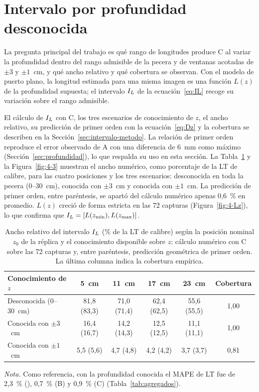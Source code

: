 \section{Intervalo por profundidad desconocida}
\label{sec:intervalo}

La pregunta principal del trabajo es qué rango de longitudes produce C al variar la profundidad dentro del rango admisible de la pecera y de ventanas acotadas de $\pm 3$ y $\pm 1$~cm, y qué ancho relativo y qué cobertura se observan. Con el modelo de puerto plano, la longitud estimada para una misma imagen es una función $L(z)$ de la profundidad supuesta; el intervalo $I_L$ de la ecuación~\eqref{eq:IL} recoge su variación sobre el rango admisible.

El cálculo de $I_L$ con C, los tres escenarios de conocimiento de $z$, el ancho relativo, su predicción de primer orden con la ecuación~\eqref{eq:Dz} y la cobertura se describen en la Sección~\ref{sec:intervalo-metodo}. La relación de primer orden reproduce el error observado de A con una diferencia de 6~mm como máximo (Sección~\ref{sec:profundidad}), lo que respalda su uso en esta sección. La Tabla~\ref{tab:intervalo} y la Figura~\ref{fig:4-3} muestran el ancho numérico, como porcentaje de la LT de calibre, para las cuatro posiciones y los tres escenarios: desconocida en toda la pecera (0--30~cm), conocida con $\pm 3$~cm y conocida con $\pm 1$~cm. La predicción de primer orden, entre paréntesis, se apartó del cálculo numérico apenas 0,6~\% en promedio. $L(z)$ creció de forma estricta en las 72 capturas (Figura~\ref{fig:4-Lz}), lo que confirma que $I_L = [L(z_{\min}), L(z_{\max})]$.

\begin{table}[H]
\centering\footnotesize
\caption{Ancho relativo del intervalo $I_L$ (\% de la LT de calibre) según la posición nominal $z_0$ de la réplica y el conocimiento disponible sobre $z$: cálculo numérico con C sobre las 72 capturas y, entre paréntesis, predicción geométrica de primer orden. La última columna indica la cobertura empírica.}
\label{tab:intervalo}
\begin{tabular}{@{}lccccc@{}}
\toprule
Conocimiento de $z$ & 5~cm & 11~cm & 17~cm & 23~cm & Cobertura \\
\midrule
Desconocida (0--30~cm) & 81,8 (83,3) & 71,0 (71,4) & 62,4 (62,5) & 55,6 (55,5) & 1,00 \\
Conocida con $\pm 3$~cm & 16,4 (16,7) & 14,2 (14,3) & 12,5 (12,5) & 11,1 (11,1) & 1,00 \\
Conocida con $\pm 1$~cm & 5,5 (5,6) & 4,7 (4,8) & 4,2 (4,2) & 3,7 (3,7) & 0,81 \\
\bottomrule
\end{tabular}

\smallskip
\begin{minipage}{0.9\textwidth}\footnotesize
\emph{Nota.} Como referencia, con la profundidad conocida el MAPE de LT fue de 2,3~\% (\Aprime), 0,7~\% (B) y 0,9~\% (C) (Tabla~\ref{tab:agregados}).
\end{minipage}
\end{table}

